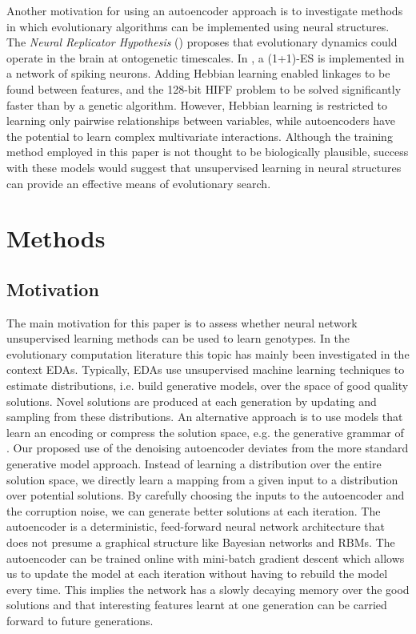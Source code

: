 \documentclass[twoside]{article}
\begin{document}
Another motivation for using an autoencoder approach is to investigate methods in which evolutionary algorithms can be implemented using neural structures. The {\em{Neural Replicator Hypothesis}} (\cite{fernando2010neuronal}) proposes that evolutionary dynamics could operate in the brain at ontogenetic timescales. In \cite{fernando2010neuronal}, a (1+1)-ES is implemented in a network of spiking neurons. Adding Hebbian learning enabled linkages to be found between features, and the 128-bit HIFF problem to be solved significantly faster than by a genetic algorithm. However, Hebbian learning is restricted to learning only pairwise relationships between variables, while autoencoders have the potential to learn complex multivariate interactions. Although the training method employed in this paper is not thought to be biologically plausible, success with these models would suggest that unsupervised learning in neural structures can provide an effective means of evolutionary search.

\section{Methods}

\subsection{Motivation}

The main motivation for this paper is to assess whether neural network unsupervised learning methods can be used to learn genotypes. In the evolutionary computation literature this topic has mainly been investigated in the context EDAs. Typically, EDAs use unsupervised machine learning techniques to estimate distributions, i.e. build generative models, over the space of good quality solutions. Novel solutions are produced at each generation by updating and sampling from these distributions. An alternative approach is to use models that learn an encoding or compress the solution space, e.g. the generative grammar of \cite{cox2014solving}. Our proposed use of the denoising autoencoder deviates from the more standard generative model approach. Instead of learning a distribution over the entire solution space, we directly learn a mapping from a given input to a distribution over potential solutions. By carefully choosing the inputs to the autoencoder and the corruption noise, we can generate better solutions at each iteration. The autoencoder is a deterministic, feed-forward neural network architecture that does not presume a graphical structure like Bayesian networks and RBMs. The autoencoder can be trained online with mini-batch gradient descent which allows us to update the model at each iteration without having to rebuild the model every time. This implies the network has a slowly decaying memory over the good solutions and that interesting features learnt at one generation can be carried forward to future generations.
\end{document}
